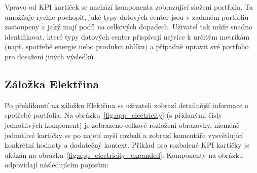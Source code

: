 Vpravo od KPI kartiček se nachází komponenta zobrazující složení portfolia. Ta umožňuje rychle pochopit, jaké typy datových center jsou v zadaném portfoliu zastoupeny a jaký mají podíl na celkových dopadech. Uživatel tak může snadno identifikovat, které typy datových center přispívají nejvíce k určitým metrikám (např. spotřebě energie nebo produkci uhlíku) a případně upravit své portfolio pro dosažení jiných výsledků.

\subsection{Záložka Elektřina}
\label{subsec:app_ui_energetika}

Po překliknutí na záložku Elektřina se uživateli zobrazí detailnější informace o spotřebě portfolia. Na obrázku~\ref{fig:app_electricity} (s přidanými čísly jednotlivých komponent) je zobrazeno celkové rozložení obrazovky, nicméně jednotlivé kartičky se po najetí myší rozbalí a zobrazí komentáře vysvětlující konkrétní hodnoty a dodatečný kontext. Příklad pro rozbalené KPI kartičky je ukázán na obrázku~\ref{fig:app_electricity_expanded}. Komponenty na obrázku odpovídají následujícím popisům:

